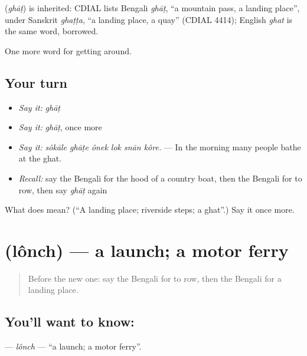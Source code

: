 \begin{cousinweb}
\textbf{} (\emph{ghāṭ}) is inherited: CDIAL lists Bengali \emph{ghāṭ}, \textquotedblleft{}a mountain pass, a landing place\textquotedblright{}, under Sanskrit \emph{ghaṭṭa}, \textquotedblleft{}a landing place, a quay\textquotedblright{} (CDIAL 4414); English \emph{ghat} is the same word, borrowed.
\end{cousinweb}

\begin{grammarlens}[title={What you've built}]
One more word for getting around.
\end{grammarlens}

\subsection*{Your turn}
\begin{itemize}
\raggedright
  \item \emph{Say it:} \emph{ghāṭ}
  \item \emph{Say it:} \emph{ghāṭ}, once more
  \item \emph{Say it:} \emph{sôkāle ghāṭe ônek lok snān kôre.} — In the morning many people bathe at the ghat.
  \item \emph{Recall:} say the Bengali for the hood of a country boat, then the Bengali for to row, then say \emph{ghāṭ} again
\end{itemize}

\begin{tcolorbox}[breakable,colback=teal!4,colframe=teal!35!black,title={Before you move on}]
What does  mean? (\textquotedblleft{}A landing place; riverside steps; a ghat\textquotedblright{}.) Say it once more.
\end{tcolorbox}
\section[\texorpdfstring{\bn{লঞ্চ} (lônch)}{লঞ্চ (lônch)}]{ (lônch) — a launch; a motor ferry}

\label{lesson:BN-C397-lonch}



\begin{quote}
Before the new one: say the Bengali for to row, then the Bengali for a landing place.
\end{quote}

\subsection*{You'll want to know: }
\textbf{} — \emph{lônch} — \textquotedblleft{}a launch; a motor ferry\textquotedblright{}.

